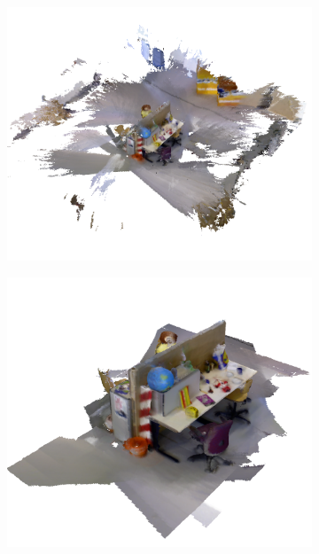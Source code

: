 \documentclass[conference]{IEEEtran}
\begin{document}
\begin{figure}
\begin{minipage}{0.25\linewidth}
\begin{subfigure}{1.0\linewidth}
			 \caption{} 
			 \label{fig:memory_data2}
		 \end{subfigure}
	 \end{minipage} 
	 \begin{minipage} {0.25\linewidth} 
	  \begin{subfigure}{1.0\linewidth} \centering 
		\includegraphics[width=1.0\textwidth]{img/freiburg_5m.png}
		 \caption{}
		 \label{fig:freiburg_5m}
	 	\end{subfigure} 
 		\begin{subfigure}{1.0\linewidth} \centering
		\includegraphics[width=1.0\textwidth]{img/freiburg_2m.png}

\end{subfigure}
\end{minipage}
\end{figure}
\end{document}

